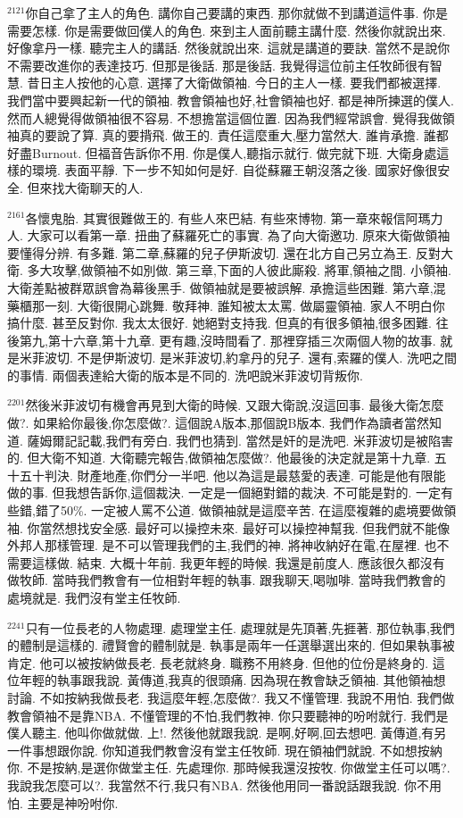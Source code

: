 \documentclass{book}
\begin{document}
$^{2121}$你自己拿了主人的角色.
講你自己要講的東西.
那你就做不到講道這件事.
你是需要怎樣.
你是需要做回僕人的角色.
來到主人面前聽主講什麼.
然後你就說出來.
好像拿丹一樣.
聽完主人的講話.
然後就說出來.
這就是講道的要訣.
當然不是說你不需要改進你的表達技巧.
但那是後話.
那是後話.
我覺得這位前主任牧師很有智慧.
昔日主人按他的心意.
選擇了大衛做領袖.
今日的主人一樣.
要我們都被選擇.
我們當中要興起新一代的領袖.
教會領袖也好,社會領袖也好.
都是神所揀選的僕人.
然而人總覺得做領袖很不容易.
不想擔當這個位置.
因為我們經常誤會.
覺得我做領袖真的要說了算.
真的要揹飛.
做王的.
責任這麼重大,壓力當然大.
誰肯承擔.
誰都好盡Burnout.
但福音告訴你不用.
你是僕人,聽指示就行.
做完就下班.
大衛身處這樣的環境.
表面平靜.
下一步不知如何是好.
自從蘇羅王朝沒落之後.
國家好像很安全.
但來找大衛聊天的人.

$^{2161}$各懷鬼胎.
其實很難做王的.
有些人來巴結.
有些來博物.
第一章來報信阿瑪力人.
大家可以看第一章.
扭曲了蘇羅死亡的事實.
為了向大衛邀功.
原來大衛做領袖要懂得分辨.
有多難.
第二章,蘇羅的兒子伊斯波切.
還在北方自己另立為王.
反對大衛.
多大攻擊,做領袖不如別做.
第三章,下面的人彼此廝殺.
將軍,領袖之間.
小領袖.
大衛差點被群眾誤會為幕後黑手.
做領袖就是要被誤解.
承擔這些困難.
第六章,混藥櫃那一刻.
大衛很開心跳舞.
敬拜神.
誰知被太太罵.
做屬靈領袖.
家人不明白你搞什麼.
甚至反對你.
我太太很好.
她絕對支持我.
但真的有很多領袖,很多困難.
往後第九,第十六章,第十九章.
更有趣,沒時間看了.
那裡穿插三次兩個人物的故事.
就是米菲波切.
不是伊斯波切.
是米菲波切,約拿丹的兒子.
還有,索羅的僕人.
洗吧之間的事情.
兩個表達給大衛的版本是不同的.
洗吧說米菲波切背叛你.

$^{2201}$然後米菲波切有機會再見到大衛的時候.
又跟大衛說,沒這回事.
最後大衛怎麼做?.
如果給你最後,你怎麼做?.
這個說A版本,那個說B版本.
我們作為讀者當然知道.
薩姆爾記記載,我們有旁白.
我們也猜到.
當然是奸的是洗吧.
米菲波切是被陷害的.
但大衛不知道.
大衛聽完報告,做領袖怎麼做?.
他最後的決定就是第十九章.
五十五十判決.
財產地產,你們分一半吧.
他以為這是最慈愛的表達.
可能是他有限能做的事.
但我想告訴你,這個裁決.
一定是一個絕對錯的裁決.
不可能是對的.
一定有些錯,錯了50\%.
一定被人罵不公道.
做領袖就是這麼辛苦.
在這麼複雜的處境要做領袖.
你當然想找安全感.
最好可以操控未來.
最好可以操控神幫我.
但我們就不能像外邦人那樣管理.
是不可以管理我們的主,我們的神.
將神收納好在電,在屋裡.
也不需要這樣做.
結束.
大概十年前.
我更年輕的時候.
我還是前度人.
應該很久都沒有做牧師.
當時我們教會有一位相對年輕的執事.
跟我聊天,喝咖啡.
當時我們教會的處境就是.
我們沒有堂主任牧師.

$^{2241}$只有一位長老的人物處理.
處理堂主任.
處理就是先頂著,先捱著.
那位執事,我們的體制是這樣的.
禮賢會的體制就是.
執事是兩年一任選舉選出來的.
但如果執事被肯定.
他可以被按納做長老.
長老就終身.
職務不用終身.
但他的位份是終身的.
這位年輕的執事跟我說.
黃傳道,我真的很頭痛.
因為現在教會缺乏領袖.
其他領袖想討論.
不如按納我做長老.
我這麼年輕,怎麼做?.
我又不懂管理.
我說不用怕.
我們做教會領袖不是靠NBA.
不懂管理的不怕,我們教神.
你只要聽神的吩咐就行.
我們是僕人聽主.
他叫你做就做.
上!.
然後他就跟我說.
是啊,好啊,回去想吧.
黃傳道,有另一件事想跟你說.
你知道我們教會沒有堂主任牧師.
現在領袖們就說.
不如想按納你.
不是按納,是選你做堂主任.
先處理你.
那時候我還沒按牧.
你做堂主任可以嗎?.
我說我怎麼可以?.
我當然不行,我只有NBA.
然後他用同一番說話跟我說.
你不用怕.
主要是神吩咐你.
\end{document}
